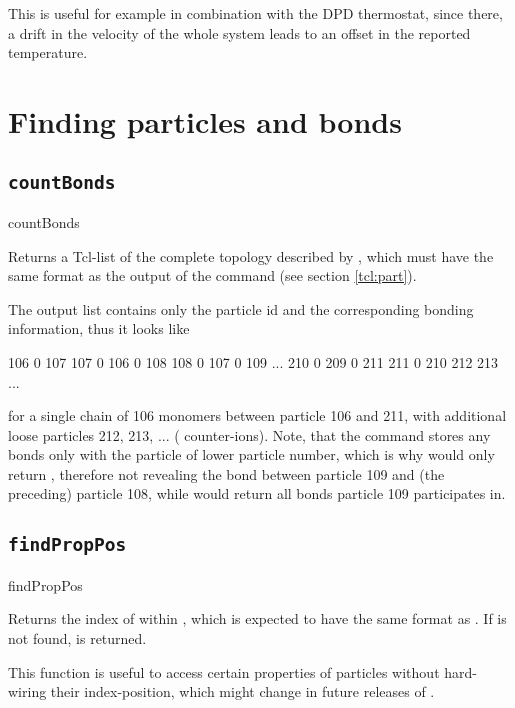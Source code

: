 This is useful for example in combination with the DPD thermostat, since there,
 a drift in the velocity of the whole system leads to an offset in the reported 
 temperature.


\section{Finding particles and bonds}

\subsection{\texttt{countBonds}}
\begin{essyntax}
  countBonds 
\end{essyntax}
Returns a Tcl-list of the complete topology described by
, which must have the same format as the output of
the command  (see section \vref{tcl:part}).

The output list contains only the particle id and the corresponding
bonding information, thus it looks like \eg{}
\begin{tclcode}
{106 {0 107}} {107 {0 106} {0 108}} {108 {0 107} {0 109}} ...
{210 {0 209} {0 211}} {211 {0 210}} 212 213 ... 
\end{tclcode}
for a single chain of 106 monomers between particle 106 and 211, with
additional loose particles 212, 213, ... (\eg{} counter-ions).  Note,
that the  command stores any bonds only with the particle of
lower particle number, which is why \codebox{[part 109]} would only
return , therefore not revealing the
bond between particle 109 and (the preceding) particle 108, while
 would return all bonds particle 109 participates in.

\subsection{\texttt{findPropPos}}
\begin{essyntax}
  findPropPos  
\end{essyntax}
Returns the index of  within
, which is expected to have the same
format as . If  is not
found,  is returned.

This function is useful to access certain properties of particles
without hard-wiring their index-position, which might change in future
releases of .

